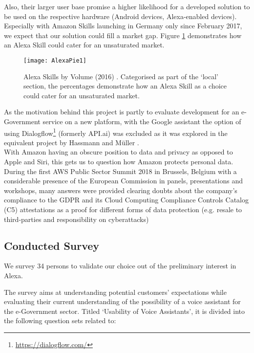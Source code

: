 Also, their larger user base promise a higher likelihood for a developed solution to be used on the respective hardware (Android devices, Alexa-enabled devices).
Especially with Amazon Skills launching in Germany only since February 2017, we expect that our solution could fill a market gap. Figure \ref{skillsbyvol} demonstrates how an Alexa Skill could cater for an unsaturated market.




\begin{figure}[h]
	\caption[Alexa Skills by Volume (2016)]{Alexa Skills by Volume (2016) \cite{voicelabs:trends}. Categorised as part of the `local' section, the percentages demonstrate how an Alexa Skill as a choice could cater for an unsaturated market.}
	\label{skillsbyvol}
	\texttt{[image: AlexaPie1]} 
\end{figure}


As the motivation behind this project is partly to evaluate development for an e-Government service on a new platform, with the Google assistant the option of using Dialogflow\footnote{\url{https://dialogflow.com/}} (formerly API.ai) was excluded as it was explored in the equivalent project by Hassmann and Müller \cite{hassmannMlr:berlina}.\\



With Amazon having an obscure position to data and privacy as opposed to Apple and Siri, this gets us to question how Amazon protects personal data. During the first AWS Public Sector Summit 2018 in Brussels, Belgium with a considerable presence of the European Commission in panels, presentations and workshops, many answers were provided clearing doubts about the company's compliance to the GDPR and its Cloud Computing Compliance Controls Catalog (C5) attestations as a proof %
for different forms of data protection (e.g. resale to
 third-parties and responsibility on cyberattacks) \cite{aws:pubsecsum}
\subsection*{Conducted Survey}

We survey 34 persons to validate our choice out of the preliminary interest in Alexa. 


The survey aims at understanding potential customers' expectations while evaluating their current understanding of the possibility of a voice assistant for the e-Government sector. Titled `Usability of Voice Assistants', it is divided into the following question sets related to:

